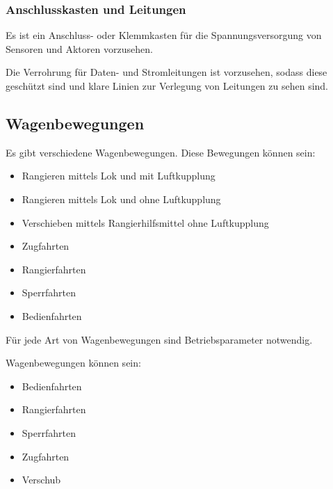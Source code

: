 \subsubsection{Anschlusskasten und Leitungen}
\begin{feat}
Es ist ein Anschluss- oder Klemmkasten für die Spannungsversorgung von Sensoren und Aktoren vorzusehen. 
\end{feat}
\begin{feat}
Die Verrohrung für Daten- und Stromleitungen ist vorzusehen, sodass diese geschützt sind und klare Linien zur Verlegung von Leitungen zu sehen sind.
\end{feat}

\subsection{Wagenbewegungen}
Es gibt verschiedene Wagenbewegungen. Diese Bewegungen können sein:
\begin{itemize}
    \item Rangieren mittels Lok und mit Luftkupplung
    \item Rangieren mittels Lok und ohne Luftkupplung
    \item Verschieben mittels Rangierhilfsmittel ohne Luftkupplung
    \item Zugfahrten
    \item Rangierfahrten
    \item Sperrfahrten
    \item Bedienfahrten
\end{itemize}
\begin{feat}
Für jede Art von Wagenbewegungen sind Betriebsparameter notwendig.
\end{feat}
\begin{rem} [zu Anf. 15]
Wagenbewegungen können sein:
\begin{itemize}
    \item Bedienfahrten
    \item Rangierfahrten
    \item Sperrfahrten
    \item Zugfahrten
    \item Verschub
\end{itemize}
\end{rem}

